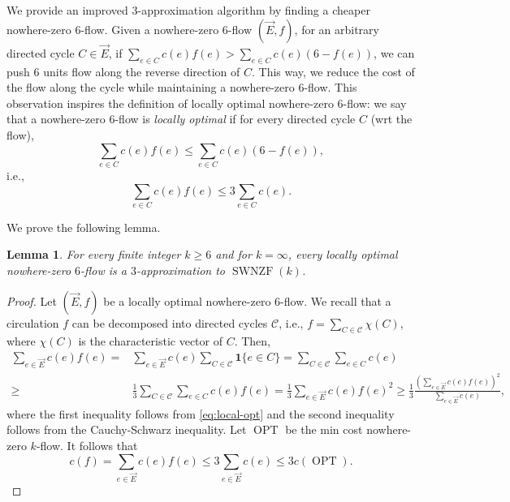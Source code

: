 \documentclass[11pt]{article}
\newtheorem{lemma}[theorem]{Lemma}
\DeclareMathOperator{\opt}{OPT}
\begin{document}
We provide an improved $3$-approximation algorithm by finding a cheaper nowhere-zero $6$-flow. Given a nowhere-zero $6$-flow $(\vec{E},f)$, for an arbitrary directed cycle $C\in\vec{E}$, if $\sum_{e\in C} c(e)f(e)>\sum_{e\in C} c(e)(6-f(e))$, we can push $6$ units flow along the reverse direction of $C$. This way, we reduce the cost of the flow along the cycle while maintaining a nowhere-zero $6$-flow. This observation inspires the definition of locally optimal nowhere-zero $6$-flow: we say that a nowhere-zero $6$-flow is \emph{locally optimal} if for every directed cycle $C$ (wrt the flow),
\[
    \sum_{e\in C} c(e)f(e)\leq \sum_{e\in C} c(e)(6-f(e)),
\]
i.e.,
\begin{equation}\label{eq:local-opt}
    \sum_{e\in C} c(e)f(e)\leq 3\sum_{e\in C} c(e).
\end{equation}

We prove the following lemma.

\begin{lemma}\label{lemma:localopt}
    For every finite integer $k\geq 6$ and for $k=\infty$, every locally optimal nowhere-zero $6$-flow is a $3$-approximation to $\operatorname{SWNZF}(k)$.
\end{lemma}
\begin{proof}
    Let $(\vec{E},f)$ be a locally optimal nowhere-zero $6$-flow. We recall that a circulation $f$ can be decomposed into directed cycles $\mathscr{C}$, i.e., $f=\sum_{C\in\mathscr{C}} \chi(C)$, where $\chi(C)$ is the characteristic vector of $C$.
    Then,
    \[
    \begin{aligned}
        \sum_{e\in \vec{E}}c(e)f(e)
        =&\sum_{e\in \vec{E}}c(e)\sum_{C\in\mathscr{C}} \mathbf{1}\{e\in C\}
        =\sum_{C\in\mathscr{C}}\sum_{e\in C} c(e)\\
        \geq& \frac{1}{3}\sum_{C\in\mathscr{C}}\sum_{e\in C} c(e)f(e)
        = \frac{1}{3}\sum_{e\in\vec{E}}c(e)f(e)^2
        \geq \frac{1}{3}\frac{(\sum_{e\in\vec{E}}c(e)f(e))^2}{\sum_{e\in\vec{E}}c(e)},
    \end{aligned}
    \]
    where the first inequality follows from \eqref{eq:local-opt} and the second inequality follows from the Cauchy-Schwarz inequality. Let $\opt$ be the min cost nowhere-zero $k$-flow.
    It follows that
\[
c(f)=\sum_{e\in \vec{E}}c(e)f(e)\leq 3 \sum_{e\in\vec{E}}c(e)\leq 3c(\opt). 
\]
\end{proof}
\end{document}
